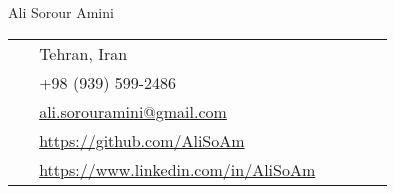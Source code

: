\begin{paracol}{2}
  \parbox[top][0.12\textheight][c]{\linewidth}
  {
    \vspace{-0.04\textheight}
    \centering
    {\sffamily\Huge Ali Sorour Amini}
  }
  \switchcolumn
  \parbox[top][0.12\textheight][c]{\linewidth}
  {
    \vspace{-0.04\textheight}
    \colorbox{shade}
    {
      \begin{supertabular}{p{0.05\linewidth}|p{0.775\linewidth}}
        \raisebox{-1pt}{\faHome} & Tehran, Iran\\
        \raisebox{-1pt}{\faPhone} & +98 (939) 599-2486 \\
        \raisebox{0pt}{\small\faEnvelope} & \href{mailto:ali.sorouramini@gmail.com}{ali.sorouramini@gmail.com} \\
        \raisebox{-1pt}{\faGithub} & \href{https://github.com/AliSoAm}{https://github.com/AliSoAm} \\
        \raisebox{-1pt}{\faLinkedinSquare} & \href{https://www.linkedin.com/in/AliSoAm}{https://www.linkedin.com/in/AliSoAm} \\
      \end{supertabular}
    }
  }
\end{paracol}
